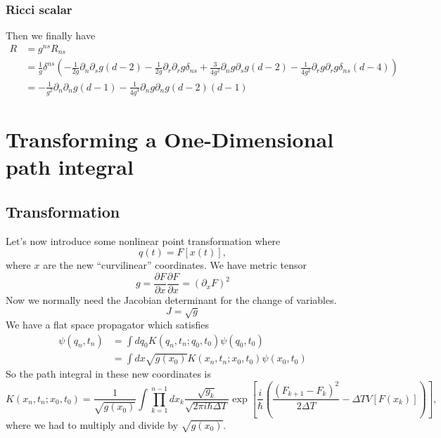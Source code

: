 \subsubsection{Ricci scalar}
Then we finally have
\begin{align}
R&=g^{ns}R_{ns}\\
&=\frac{1}{g}\delta^{ns}\left(-\frac{1}{2g}\partial_n\partial_s g(d-2) - \frac{1}{2g}\partial_r\partial_rg\delta _{ns}  + \frac{3}{4g^2}\partial_n g \partial_s g ( d-2 )  - \frac{1}{4g^2}\partial_r g\partial_rg\delta_{ns}(d-4)\right)\\
&=-\frac{1}{g^2}\partial_n\partial_n g(d-1)   - \frac{1}{4g^3}\partial_n g \partial_n g (d-2)(d-1)
\end{align}


\section{Transforming a One-Dimensional path integral}
\subsection{Transformation}

Let's now introduce some nonlinear point transformation where 
\begin{equation}
q(t) = F[x(t)],
\end{equation}
where $x$ are the new ``curvilinear'' coordinates.  We have metric tensor 
\begin{equation}
g = \frac{\partial F}{\partial x}\frac{\partial F}{\partial x} = (\partial_xF)^2
\end{equation}
Now we normally need the Jacobian determinant for the change of variables.  
\begin{equation}
J = \sqrt{g}
\end{equation}
We have a flat space propagator which satisfies 
\begin{align}
\psi(q_n,t_n) &= \int dq_0 K(q_n,t_n; q_0,t_0)\psi(q_0,t_0)\\
&= \int dx \sqrt{g(x_0)}K(x_n,t_n; x_0,t_0)\psi(x_0,t_0)
\end{align}
So the path integral in these new coordinates is
\begin{equation}
K(x_n,t_n; x_0,t_0) = \frac{1}{\sqrt{g(x_0)}}\int \prod_{k=1}^{n-1} dx_k\frac{\sqrt{g_k}}{\sqrt{2\pi i \hbar \Delta T}} \exp\left[ \frac{i}{\hbar}\left(\frac{(F_{k+1}-F_{k})^2}{2\Delta T} -\Delta T V[F(x_k)]\right)\right],
\end{equation}
where we had to multiply and divide by $\sqrt{g(x_0)}$. 
